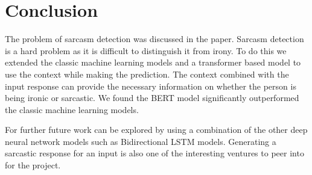 \documentclass[10pt,twocolumn,letterpaper]{article}
\begin{document}
\section{Conclusion}

The problem of sarcasm detection was discussed in the paper. Sarcasm detection is a hard problem as it is difficult to distinguish it from irony. To do this we extended the classic machine learning models and a transformer based model to use the context while making the prediction. The context combined with the input response can provide the necessary information on whether the person is being ironic or sarcastic. We found the BERT model significantly outperformed the classic machine learning models.

For further future work can be explored by using a combination of the other deep neural network models such as Bidirectional LSTM models. Generating a sarcastic response for an input is also one of the interesting ventures to peer into for the project.

{\small


}
\end{document}
